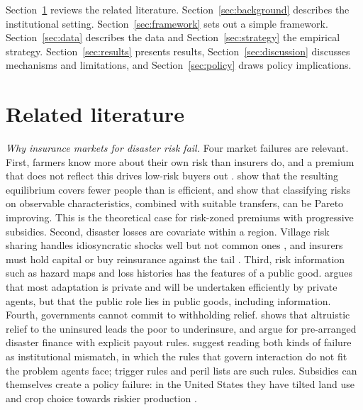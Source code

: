 \documentclass[11pt,a4paper]{article}
\begin{document}
Section~\ref{sec:lit} reviews the related literature. Section~\ref{sec:background} describes the institutional setting. Section~\ref{sec:framework} sets out a simple framework. Section~\ref{sec:data} describes the data and Section~\ref{sec:strategy} the empirical strategy. Section~\ref{sec:results} presents results, Section~\ref{sec:discussion} discusses mechanisms and limitations, and Section~\ref{sec:policy} draws policy implications.

\section{Related literature}
\label{sec:lit}

\textit{Why insurance markets for disaster risk fail.} Four market failures are relevant. First, farmers know more about their own risk than insurers do, and a premium that does not reflect this drives low-risk buyers out \parencite{akerlof1970,rothschild1976}. \textcite{einav2011} show that the resulting equilibrium covers fewer people than is efficient, and \textcite{crocker1986} show that classifying risks on observable characteristics, combined with suitable transfers, can be Pareto improving. This is the theoretical case for risk-zoned premiums with progressive subsidies. Second, disaster losses are covariate within a region. Village risk sharing handles idiosyncratic shocks well but not common ones \parencite{townsend1994,dercon2002}, and insurers must hold capital or buy reinsurance against the tail \parencite{kunreuther1996}. Third, risk information such as hazard maps and loss histories has the features of a public good. \textcite{mendelsohn2000} argues that most adaptation is private and will be undertaken efficiently by private agents, but that the public role lies in public goods, including information. Fourth, governments cannot commit to withholding relief. \textcite{coate1995} shows that altruistic relief to the uninsured leads the poor to underinsure, and \textcite{clarkedercon2016} argue for pre-arranged disaster finance with explicit payout rules. \textcite{furton2019} suggest reading both kinds of failure as institutional mismatch, in which the rules that govern interaction do not fit the problem agents face; trigger rules and peril lists are such rules. Subsidies can themselves create a policy failure: in the United States they have tilted land use and crop choice towards riskier production \parencite{goodwin2013}.
\end{document}
